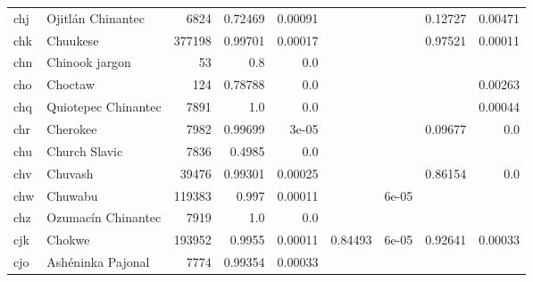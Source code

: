 \documentclass[11pt]{article}
\begin{document}
\begin{table*}[h]
{\begin{tabular}{llrrrrrrr}
chj         & Ojitlán Chinantec         & 6824         & 0.72469         & 0.00091         &          &          & 0.12727         & 0.00471         \\

chk         & Chuukese         & 377198         & 0.99701         & 0.00017         &          &          & 0.97521         & 0.00011         \\

chn         & Chinook jargon         & 53         & 0.8         & 0.0         &          &          &          &          \\

cho         & Choctaw         & 124         & 0.78788         & 0.0         &          &          &          & 0.00263         \\

chq         & Quiotepec Chinantec         & 7891         & 1.0         & 0.0         &          &          &          & 0.00044         \\

chr         & Cherokee         & 7982         & 0.99699         & 3e-05         &          &          & 0.09677         & 0.0         \\

chu         & Church Slavic         & 7836         & 0.4985         & 0.0         &          &          &          &          \\

chv         & Chuvash         & 39476         & 0.99301         & 0.00025         &          &          & 0.86154         & 0.0         \\

chw         & Chuwabu         & 119383         & 0.997         & 0.00011         &          & 6e-05         &          &          \\

chz         & Ozumacín Chinantec         & 7919         & 1.0         & 0.0         &          &          &          &          \\

cjk         & Chokwe         & 193952         & 0.9955         & 0.00011         & 0.84493         & 6e-05         & 0.92641         & 0.00033         \\

cjo         & Ashéninka Pajonal         & 7774         & 0.99354         & 0.00033         &          &          &          &          \\


\end{tabular}}
\end{table*}
\end{document}
